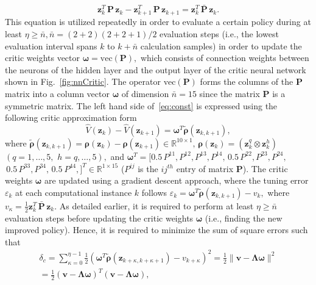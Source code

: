 \documentclass[conference]{IEEEtran}
\begin{document}
 \begin{equation}
 \label{eq:const}
 \mathbf{z}_k^T\, \mathbf{P}\, \mathbf{z}_k - \mathbf{z}_{k+1}^T\, \mathbf{P}\, \mathbf{z}_{k+1} = \mathbf{z}_k^T\, \bar{\mathbf{P}}\, \mathbf{z}_k. 
 \end{equation}
 This equation is utilized repeatedly in order to evaluate a certain policy during at least $\eta\ge \bar n, \bar n= (2+2)(2+2+1)/2$ evaluation steps (i.e., the lowest evaluation interval spans $k$ to $k+\bar n$ calculation samples) in order to update the critic weights vector  $\boldsymbol{\omega}=\mathrm{vec}(\mathbf{P}),$ which consists of connection weights between the neurons of the hidden layer and the output layer of the critic neural network shown in Fig.~\eqref{fig:nnCritic}. The operator $\mathrm{vec}(\mathbf{P})$ forms the columns of the $\mathbf{P}$ matrix into a column vector $\mathbf{\omega}$ of dimension $\bar{n}=15$ since the matrix $\mathbf{P}$ is a symmetric matrix. The left hand side of~\eqref{eq:const} is expressed using the following critic approximation form %
 $$\hat{V}(\mathbf{z}_k)-\hat{V}(\mathbf{z}_{k+1})=\boldsymbol{\omega}^T\tilde{\bm{\rho}}(\mathbf{z}_{k,k+1}),$$
 where $\tilde{\bm{\rho}}(\mathbf{z}_{k,k+1})=\bm{\rho}(\mathbf{z}_k)-\bm{\rho}(\mathbf{z}_{k+1}) \in \mathbb{R}^{10 \times 1}, \, \bm{\rho}(\mathbf{z}_k)=\left(\mathbf{z}^q_k\otimes\mathbf{z}^h_k\right)$ $(q=1,\dots, 5, \,\, h=q,\dots,5),$ and $\boldsymbol{\omega}^T = [0.5 \, P^{11},P^{12},P^{13},P^{14},  \, 0.5 \, P^{22}, P^{23},P^{24},$ $\,0.5 \, P^{33}, P^{34},\,0.5 \ P^{44}, ]^T \in \mathbb{R}^{1\times 15}$ ($P^{ij}$ is the $ij^{th}$ entry of matrix $\mathbf{P}$). %
 The critic weights $\boldsymbol{\omega}$ are updated using a gradient descent approach, where the tuning error $\varepsilon_k$ at each computational instance $k$ follows $\varepsilon_k =\boldsymbol{\omega}^T\tilde{\bm{\rho}}(\mathbf{z}_{k,k+1})-{v}_k,$ where $v_\kappa = \frac{1}{2}\mathbf{z}_{k}^T \, \bar{\mathbf{P}} \, \mathbf{z}_{k}$. As detailed earlier, it is required to perform at least $\eta \ge \bar n$ evaluation steps before updating the critic weights $\boldsymbol{\omega}$ (i.e., finding the new improved policy). Hence, it is required to minimize the sum of square errors such that %
 \begin{multline*}
   \delta_c =\sum_{\kappa=0}^{\eta-1}\frac{1}{2}(\boldsymbol{\omega}^T\tilde{\bm{\rho}}(\mathbf{z}_{k+\kappa,k+\kappa+1})-{v}_{k+\kappa})^2 = \frac{1}{2}\| \mathbf{v} - \bm{\Lambda}\bm{\omega}\|^2\\
   =\frac{1}{2}\left(\mathbf{v} - \bm{\Lambda}\bm{\omega}\right)^T \left(\mathbf{v} - \bm{\Lambda}\bm{\omega}\right), 
 \end{multline*}
\end{document}
